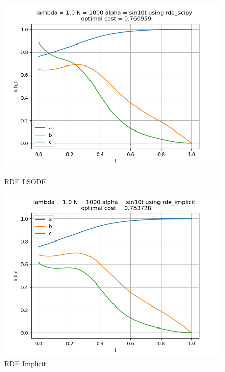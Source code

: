 \begin{figure}[H]
	\centering
	\begin{minipage}{0.3\textwidth}
		\centering
		\includegraphics[width=\linewidth]{rde_scipy_l1_alphasin.png}
		\caption{RDE LSODE}
	\end{minipage}
	\hfill
	\begin{minipage}{0.3\textwidth}
		\centering
		\includegraphics[width=\linewidth]{rde_implicit_l1_alphasin.png}
		\caption{RDE Implicit}
	\end{minipage}
	\hfill
	\begin{minipage}{0.3\textwidth}
		\centering

\end{minipage}
\end{figure}

